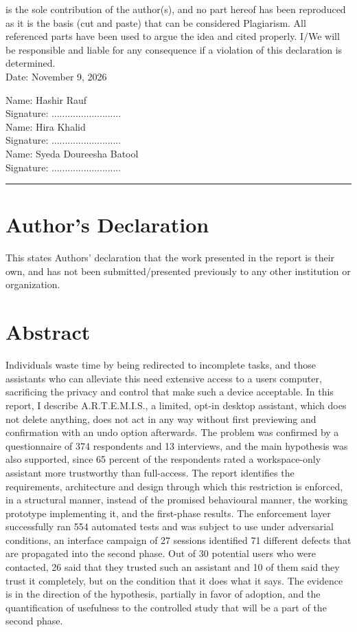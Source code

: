 \documentclass{FastFyp}
\begin{document}
is the sole contribution of the author(s), and no part hereof has been reproduced as it is the basis (cut and paste) that can be considered Plagiarism. All referenced parts have been used to argue the idea and cited properly. I/We will be responsible and liable for any consequence if a violation of this declaration is determined.
\\[4ex]
Date: November 9, 2026

\begin{flushright}
Name: Hashir Rauf
\\[3ex]
Signature: ..........................
\\[6ex]
Name: Hira Khalid
\\[3ex]
Signature: ..........................
\\[6ex]
Name: Syeda Doureesha Batool
\\[3ex]
Signature: ..........................

\end{flushright}

\vspace{5 cm}

\hrule

\section*{Author's Declaration}
This states Authors' declaration that the work presented in the report is their own, and has not been submitted/presented previously to any other institution or organization.
\pagebreak

\section*{Abstract}
Individuals waste time by being redirected to incomplete tasks, and those assistants who can alleviate this need extensive access to a users computer, sacrificing the privacy and control that make such a device acceptable. In this report, I describe A.R.T.E.M.I.S., a limited, opt-in desktop assistant, which does not delete anything, does not act in any way without first previewing and confirmation with an undo option afterwards. The problem was confirmed by a questionnaire of 374 respondents and 13 interviews, and the main hypothesis was also supported, since 65 percent of the respondents rated a workspace-only assistant more trustworthy than full-access. The report identifies the requirements, architecture and design through which this restriction is enforced, in a structural manner, instead of the promised behavioural manner, the working prototype implementing it, and the first-phase results. The enforcement layer successfully ran 554 automated tests and was subject to use under adversarial conditions, an interface campaign of 27 sessions identified 71 different defects that are propagated into the second phase. Out of 30 potential users who were contacted, 26 said that they trusted such an assistant and 10 of them said they trust it completely, but on the condition that it does what it says. The evidence is in the direction of the hypothesis, partially in favor of adoption, and the quantification of usefulness to the controlled study that will be a part of the second phase.
\pagebreak
\end{document}
